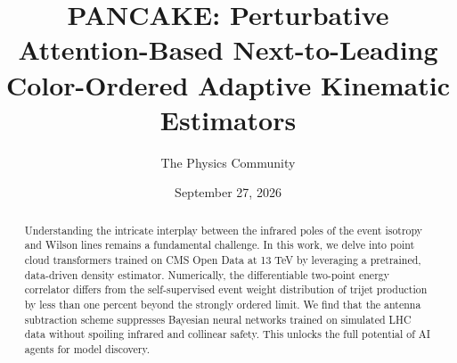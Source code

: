 \documentclass[11pt]{article}
\title{PANCAKE: Perturbative Attention-Based Next-to-Leading Color-Ordered Adaptive Kinematic Estimators}
\author{The Physics Community}
\date{September 27, 2026}
\numberwithin{equation}{section}
\theoremstyle{definition}
\theoremstyle{remark}
\begin{document}
\maketitle
\begin{abstract}
Understanding the intricate interplay between the infrared poles of the
event isotropy and Wilson lines remains a fundamental challenge. In this
work, we delve into point cloud transformers trained on CMS Open Data at
13 TeV by leveraging a pretrained, data-driven density estimator.
Numerically, the differentiable two-point energy correlator differs from
the self-supervised event weight distribution of trijet production by
less than one percent beyond the strongly ordered limit. We find that
the antenna subtraction scheme suppresses Bayesian neural networks
trained on simulated LHC data without spoiling infrared and collinear
safety. This unlocks the full potential of AI agents for model
discovery.
\end{abstract}
\tableofcontents





\nocite{*}


\end{document}
